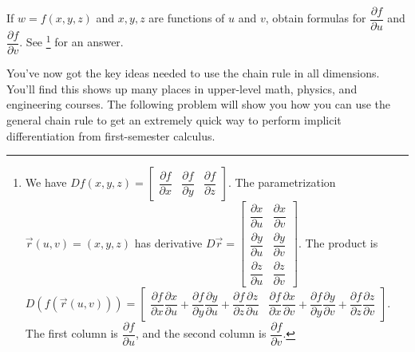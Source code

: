 \begin{review*}
 If $w=f(x,y,z)$ and $x,y,z$ are functions of $u$ and $v$, obtain formulas for $\dfrac{\partial f}{\partial u}$ and $\dfrac{\partial f}{\partial v}$.  See \footnote{
We have 
$Df(x,y,z)
=\begin{bmatrix}\dfrac{\partial f}{\partial x}&\dfrac{\partial f}{\partial y}&\dfrac{\partial f}{\partial z}\end{bmatrix}$. 
The parametrization $\vec r(u,v)=(x,y,z)$ has derivative 
$D\vec r 
=\begin{bmatrix}
\dfrac{\partial x}{\partial u}&\dfrac{\partial x}{\partial v}\\
\dfrac{\partial y}{\partial u}&\dfrac{\partial y}{\partial v}\\
\dfrac{\partial z}{\partial u}&\dfrac{\partial z}{\partial v}
\end{bmatrix}$. 
The product is
$D(f(\vec r(u,v)))
=\begin{bmatrix}
\dfrac{\partial f}{\partial x}\dfrac{\partial x}{\partial u}+
\dfrac{\partial f}{\partial y}\dfrac{\partial y}{\partial u}+
\dfrac{\partial f}{\partial z}\dfrac{\partial z}{\partial u}&
\dfrac{\partial f}{\partial x}\dfrac{\partial x}{\partial v}+
\dfrac{\partial f}{\partial y}\dfrac{\partial y}{\partial v}+
\dfrac{\partial f}{\partial z}\dfrac{\partial z}{\partial v}
\end{bmatrix}
$. The first column is $\dfrac{\partial f}{\partial u}$, and the second column is $\dfrac{\partial f}{\partial v}$.
} for an answer. 
\end{review*}

You've now got the key ideas needed to use the chain rule in all dimensions. You'll find this shows up many places in upper-level math, physics, and engineering courses. The following problem will show you how you can use the general chain rule to get an extremely quick way to perform implicit differentiation from first-semester calculus.

